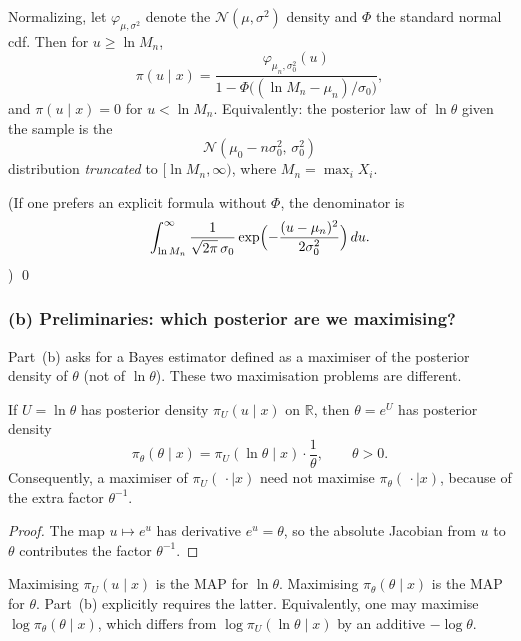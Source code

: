 \documentclass[11pt,a4paper]{article}
\begin{document}
Normalizing, let \(\varphi_{\mu,\sigma^2}\) denote the \(\mathcal{N}(\mu,\sigma^2)\) density and \(\Phi\) the standard normal cdf. Then for \(u\ge\ln M_n\),
\begin{equation}
\label{eq:p10a-post}
\pi(u\mid x)
=
\frac{\varphi_{\mu_n,\sigma_0^2}(u)}{1-\Phi\bigl((\ln M_n-\mu_n)/\sigma_0\bigr)},
\end{equation}
and \(\pi(u\mid x)=0\) for \(u<\ln M_n\). Equivalently: the posterior law of \(\ln\theta\) given the sample is the
\[
\mathcal{N}(\mu_0-n\sigma_0^2,\,\sigma_0^2)
\]
distribution \emph{truncated} to \([\ln M_n,\infty)\), where \(M_n=\max_i X_i\).

(If one prefers an explicit formula without \(\Phi\), the denominator is
\[
\int_{\ln M_n}^\infty
\frac{1}{\sqrt{2\pi}\,\sigma_0}
\exp\Bigl(-\frac{(u-\mu_n)^2}{2\sigma_0^2}\Bigr)\,du.
\])
\qed

\subsubsection{(b) Preliminaries: which posterior are we maximising?}

Part~(b) asks for a Bayes estimator defined as a maximiser of the posterior density of \(\theta\) (not of \(\ln\theta\)). These two maximisation problems are different.

\begin{lemma}
\label{lem:p10b-jac}
If \(U=\ln\theta\) has posterior density \(\pi_U(u\mid x)\) on \(\mathbb{R}\), then \(\theta=e^U\) has posterior density
\[
\pi_\theta(\theta\mid x)
=
\pi_U(\ln\theta\mid x)\cdot\frac{1}{\theta},
\qquad
\theta>0.
\]
Consequently, a maximiser of \(\pi_U(\,\cdot\mid x)\) need not maximise \(\pi_\theta(\,\cdot\mid x)\), because of the extra factor \(\theta^{-1}\).
\end{lemma}

\begin{proof}
The map \(u\mapsto e^u\) has derivative \(e^u=\theta\), so the absolute Jacobian from \(u\) to \(\theta\) contributes the factor \(\theta^{-1}\).
\end{proof}

\begin{remark*}
Maximising \(\pi_U(u\mid x)\) is the MAP for \(\ln\theta\). Maximising \(\pi_\theta(\theta\mid x)\) is the MAP for \(\theta\). Part~(b) explicitly requires the latter. Equivalently, one may maximise \(\log\pi_\theta(\theta\mid x)\), which differs from \(\log\pi_U(\ln\theta\mid x)\) by an additive \(-\log\theta\).
\end{remark*}
\end{document}
